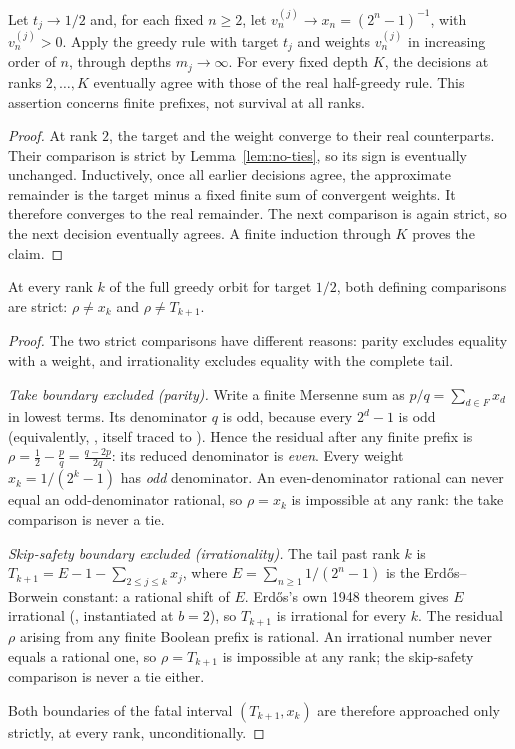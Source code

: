 \begin{prop}
\label{prop:one-orbit}
Let $t_j\to1/2$ and, for each fixed $n\ge2$, let
$v_n^{(j)}\to x_n=(2^n-1)^{-1}$, with $v_n^{(j)}>0$.
Apply the greedy rule with target $t_j$ and weights $v_n^{(j)}$ in
increasing order of $n$, through depths $m_j\to\infty$.
For every fixed depth $K$, the decisions at ranks $2,\ldots,K$
eventually agree with those of the real half-greedy rule.
This assertion concerns finite prefixes, not survival at all ranks.
\end{prop}
\begin{proof}
At rank $2$, the target and the weight converge to their real counterparts.
Their comparison is strict by Lemma~\ref{lem:no-ties}, so its sign is
eventually unchanged.  Inductively, once all earlier decisions agree,
the approximate remainder is the target minus a fixed finite sum of
convergent weights.  It therefore converges to the real remainder.
The next comparison is again strict, so the next decision eventually
agrees.  A finite induction through $K$ proves the claim.
\end{proof}
\begin{lem}
\label{lem:no-ties}
At every rank $k$ of the full greedy orbit for target $1/2$, both defining comparisons are strict:
$\rho\ne x_k$ and $\rho\ne T_{k+1}$.
\end{lem}
\begin{proof}
The two strict comparisons have different reasons: parity excludes
equality with a weight, and irrationality excludes equality with the
complete tail.

\emph{Take boundary excluded (parity).} Write a finite Mersenne sum as $p/q=\sum_{d\in F}x_d$ in lowest
terms.  Its denominator $q$ is odd, because every $2^d-1$ is odd
(equivalently, , itself
traced to ). Hence the residual
after any finite prefix is $\rho=\tfrac12-\tfrac pq=\tfrac{q-2p}{2q}$: its reduced denominator
is \emph{even}. Every weight $x_k=1/(2^k-1)$ has \emph{odd} denominator. An even-denominator
rational can never equal an odd-denominator rational, so $\rho=x_k$ is impossible at any rank:
the take comparison is never a tie.

\emph{Skip-safety boundary excluded (irrationality).} The tail past rank $k$ is
$T_{k+1}=E-1-\sum_{2\le j\le k}x_j$, where $E=\sum_{n\ge1}1/(2^n-1)$ is the Erdős--Borwein
constant: a rational shift of $E$. Erdős's own 1948 theorem gives $E$ irrational
(, instantiated at $b=2$), so
$T_{k+1}$ is irrational for every $k$. The residual $\rho$ arising from any finite Boolean prefix
is rational. An irrational number never equals a rational one, so $\rho=T_{k+1}$ is impossible at
any rank; the skip-safety comparison is never a tie either.

Both boundaries of the fatal interval $(T_{k+1},x_k)$ are therefore approached only strictly, at
every rank, unconditionally.
\end{proof}
